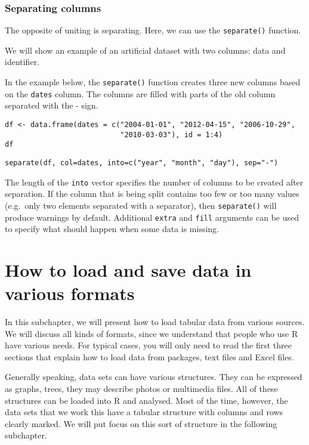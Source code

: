 \documentclass[]{book}
\theoremstyle{definition}
\theoremstyle{definition}
\theoremstyle{definition}
\theoremstyle{remark}
\begin{document}
\subsubsection*{Separating columns}\label{separating-columns}

The opposite of uniting is separating. Here, we can use the
\texttt{separate()} function.

We will show an example of an artificial dataset with two columns: data
and identifier.

In the example below, the \texttt{separate()} function creates three new
columns based on the \texttt{dates} column. The columns are filled with
parts of the old column separated with the - sign.

\begin{verbatim}
df <- data.frame(dates = c("2004-01-01", "2012-04-15", "2006-10-29",
                           "2010-03-03"), id = 1:4)
df
\end{verbatim}

\begin{verbatim}
separate(df, col=dates, into=c("year", "month", "day"), sep="-")
\end{verbatim}

The length of the \texttt{into} vector specifies the number of columns
to be created after separation. If the column that is being split
contains too few or too many values (e.g.~only two elements separated
with a separator), then \texttt{separate()} will produce warnings by
default. Additional \texttt{extra} and \texttt{fill} arguments can be
used to specify what should happen when some data is missing.

\section{How to load and save data in various formats}\label{part_26}

In this subchapter, we will present how to load tabular data from
various sources. We will discuss all kinds of formats, since we
understand that people who use R have various needs. For typical cases,
you will only need to read the first three sections that explain how to
load data from packages, text files and Excel files.

Generally speaking, data sets can have various structures. They can be
expressed as graphs, trees, they may describe photos or multimedia
files. All of these structures can be loaded into R and analysed. Most
of the time, however, the data sets that we work this have a tabular
structure with columns and rows clearly marked. We will put focus on
this sort of structure in the following subchapter.
\end{document}
